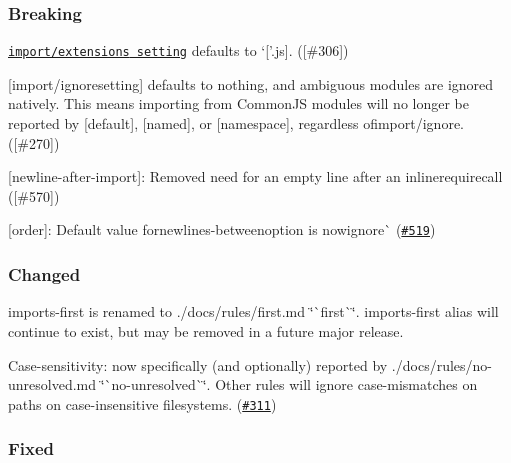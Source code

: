 \subsubsection*{Breaking}


\begin{DoxyItemize}
\item \href{./README.md#importextensions}{\tt {\ttfamily import/extensions} setting} defaults to `\mbox{[}'.js\textquotesingle{}\mbox{]}{\ttfamily . (\mbox{[}\#306\mbox{]})}
\item {\ttfamily \mbox{[}}import/ignore{\ttfamily setting\mbox{]} defaults to nothing, and ambiguous modules are ignored natively. This means importing from Common\+JS modules will no longer be reported by \mbox{[}}default{\ttfamily \mbox{]}, \mbox{[}}named{\ttfamily \mbox{]}, or \mbox{[}}namespace{\ttfamily \mbox{]}, regardless of}import/ignore{\ttfamily . (\mbox{[}\#270\mbox{]})}
\item {\ttfamily \mbox{[}}newline-\/after-\/import{\ttfamily \mbox{]}\+: Removed need for an empty line after an inline}require{\ttfamily call (\mbox{[}\#570\mbox{]})}
\item {\ttfamily \mbox{[}}order{\ttfamily \mbox{]}\+: Default value for}newlines-\/between{\ttfamily option is now}ignore\`{} (\href{https://github.com/benmosher/eslint-plugin-import/issues/519}{\tt \#519})
\end{DoxyItemize}

\subsubsection*{Changed}


\begin{DoxyItemize}
\item {\ttfamily imports-\/first} is renamed to ./docs/rules/first.md \char`\"{}\`{}first\`{}\char`\"{}. {\ttfamily imports-\/first} alias will continue to exist, but may be removed in a future major release.
\item Case-\/sensitivity\+: now specifically (and optionally) reported by ./docs/rules/no-\/unresolved.md \char`\"{}\`{}no-\/unresolved\`{}\char`\"{}. Other rules will ignore case-\/mismatches on paths on case-\/insensitive filesystems. (\href{https://github.com/benmosher/eslint-plugin-import/issues/311}{\tt \#311})
\end{DoxyItemize}

\subsubsection*{Fixed}


